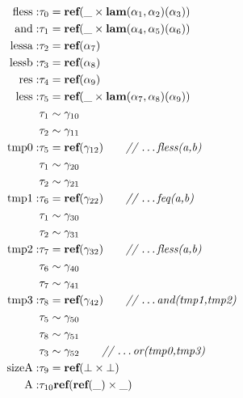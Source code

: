 $$
\begin{aligned}
\text{fless} :& \tau_{0} = \text{\bf ref}(\_ \times \text{\bf lam}(\alpha_1, \alpha_2)(\alpha_3))\\
\text{and}   :& \tau_{1} = \text{\bf ref}(\_ \times \text{\bf lam}(\alpha_4, \alpha_5)(\alpha_6))\\
\text{lessa} :& \tau_{2} = \text{\bf ref}(\alpha_7) \\
\text{lessb} :& \tau_{3} = \text{\bf ref}(\alpha_8) \\
\text{res}   :& \tau_{4} = \text{\bf ref}(\alpha_9) \\
\text{less}  :& \tau_{5} = \text{\bf ref}(\_ \times \text{\bf lam}(\alpha_7, \alpha_8)(\alpha_9)) \\
             & \tau_1 \sim \gamma_{10}\\
             & \tau_2 \sim \gamma_{11}\\
\text{tmp0} :& \tau_5 = \text{\bf ref}(\gamma_{12}) \qquad \text{\it // \ldots fless(a,b)}\\
             & \tau_1 \sim \gamma_{20}\\
             & \tau_2 \sim \gamma_{21}\\
\text{tmp1} :& \tau_6 = \text{\bf ref}(\gamma_{22}) \qquad \text{\it // \ldots feq(a,b)} \\
             & \tau_1 \sim \gamma_{30}\\
             & \tau_2 \sim \gamma_{31}\\
\text{tmp2} :& \tau_7 = \text{\bf ref}(\gamma_{32}) \qquad \text{\it // \ldots fless(a,b)}\\
             & \tau_6 \sim \gamma_{40}\\
             & \tau_7 \sim \gamma_{41}\\
\text{tmp3} :& \tau_8 = \text{\bf ref}(\gamma_{42}) \qquad \text{\it // \ldots and(tmp1,tmp2)}\\
             & \tau_5 \sim \gamma_{50}\\
             & \tau_8 \sim \gamma_{51}\\
             & \tau_3 \sim \gamma_{52} \qquad \text{\it // \ldots or(tmp0,tmp3)}\\
\text{sizeA}:& \tau_9 = \text{\bf ref}(\bot \times \bot) \\
\text{A}    :& \tau_{10} \text{\bf ref}(\text{\bf ref}(\_) \times \_) \\


\end{aligned}
$$